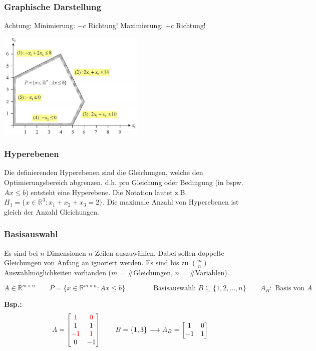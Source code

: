  	\subsubsection{Graphische Darstellung}
 	  Achtung: Minimierung: $-c$ Richtung! Maximierung: $+c$ Richtung!
 	  
 	  \includegraphics[width=7cm]{./Content/LinProg/Hyperplanes}
 	  
  \subsubsection{Hyperebenen}
    Die definierenden Hyperebenen sind die Gleichungen, welche den Optimierungsbereich abgrenzen, d.h. pro Gleichung oder Bedingung (in bspw. $Ax \leq b$) entsteht eine Hyperebene. Die Notation lautet z.B. $H_1 = \{x \in \mathbb{R}^3: x_1 + x_2 + x_3 = 2\}$. Die maximale Anzahl von Hyperebenen ist gleich der Anzahl Gleichungen.
    
  \subsubsection{Basisauswahl}
    Es sind bei $n$ Dimensionen $n$ Zeilen auszuwählen. Dabei sollen doppelte Gleichungen von Anfang an ignoriert werden.
    Es sind bis zu $\binom{m}{n}$ Auswahlmöglichkeiten vorhanden ($m$ = \#Gleichungen, $n$ = \#Variablen).
    
    \[ A \in \mathbb{R}^{m\times n} \qquad P = \{ x \in \mathbb{R}^{m\times n} : A x \leq b \} \qquad \qquad \text{Basisauswahl: }B\subseteq \{1,2,...,n\} \qquad  A_B : \text{ Basis von }A \]
    
    \textbf{Bsp.:}
    \[  A=
    	\begin{bmatrix}
    		\textcolor{red}{1} & \textcolor{red}{0} \\
    		1 & 1 \\
    		\textcolor{red}{-1} & \textcolor{red}{1} \\
    		0 & -1
    	\end{bmatrix}
    	\qquad
    	B=\{1,3\} \longrightarrow A_B = 
    	\begin{bmatrix}
 	    		1 & 0 \\
 	    		-1 & 1
    	 \end{bmatrix}
    \]
    
